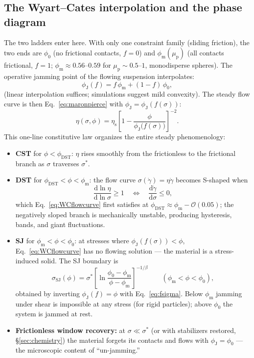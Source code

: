 \documentclass[11pt]{article}
\newcommand{\phiJ}{\phi_{\mathrm{J}}}
\newcommand{\phiO}{\phi_{0}}
\newcommand{\phiM}{\phi_{\mathrm{m}}}
\newcommand{\sigmastar}{\sigma^{*}}
\newcommand{\etas}{\eta_{\mathrm{s}}}
\newcommand{\mup}{\mu_{\mathrm{p}}}
\newcommand{\gdot}{\dot{\gamma}}
\begin{document}
\subsection{The Wyart--Cates interpolation and the phase diagram}
\label{sec:WC}
The two ladders enter here. With only one constraint family (sliding friction), the two ends are $\phiO$ (no frictional contacts, $f=0$) and $\phiM(\mup)$ (all contacts frictional, $f=1$; $\phiM \approx 0.56$--$0.59$ for $\mup \sim 0.5$--$1$, monodisperse spheres). The operative jamming point of the flowing suspension interpolates:
\begin{equation}
\phiJ(f) = f\,\phiM + (1-f)\,\phiO ,
\label{eq:phiJf}
\end{equation}
(linear interpolation suffices; simulations suggest mild convexity). The steady flow curve is then Eq.~\eqref{eq:maronpierce} with $\phiJ = \phiJ(f(\sigma))$:
\begin{equation}
\eta(\sigma,\phi) = \etas \left[1 - \frac{\phi}{\phiJ\!\big(f(\sigma)\big)}\right]^{-2}.
\label{eq:WCflowcurve}
\end{equation}
This one-line constitutive law organizes the entire steady phenomenology:

\begin{itemize}
\item \textbf{CST} for $\phi < \phi_{\mathrm{DST}}$: $\eta$ rises smoothly from the frictionless to the frictional branch as $\sigma$ traverses $\sigmastar$.
\item \textbf{DST} for $\phi_{\mathrm{DST}} < \phi < \phiM$: the flow curve $\sigma(\gdot) = \eta\gdot$ becomes S-shaped when
\begin{equation}
\frac{\mathrm{d}\ln \eta}{\mathrm{d}\ln \sigma} \ge 1
\quad\Longleftrightarrow\quad
\frac{\mathrm{d}\gdot}{\mathrm{d}\sigma} \le 0,
\label{eq:DSTcriterion}
\end{equation}
which Eq.~\eqref{eq:WCflowcurve} first satisfies at $\phi_{\mathrm{DST}} \approx \phiM - \mathcal{O}(0.05)$; the negatively sloped branch is mechanically unstable, producing hysteresis, bands, and giant fluctuations.
\item \textbf{SJ} for $\phiM < \phi < \phiO$: at stresses where $\phiJ(f(\sigma)) < \phi$, Eq.~\eqref{eq:WCflowcurve} has no flowing solution --- the material is a stress-induced solid. The SJ boundary is
\begin{equation}
\sigma_{\mathrm{SJ}}(\phi) = \sigmastar \left[\ln\frac{\phiO - \phiM}{\phi - \phiM}\right]^{-1/\beta}
\qquad (\phiM < \phi < \phiO),
\label{eq:SJboundary}
\end{equation}
obtained by inverting $\phiJ(f)=\phi$ with Eq.~\eqref{eq:fsigma}. Below $\phiM$ jamming under shear is impossible at any stress (for rigid particles); above $\phiO$ the system is jammed at rest.
\item \textbf{Frictionless window recovery:} at $\sigma \ll \sigmastar$ (or with stabilizers restored, \S\ref{sec:chemistry}) the material forgets its contacts and flows with $\phiJ = \phiO$ --- the microscopic content of ``un-jamming.''
\end{itemize}
\end{document}
